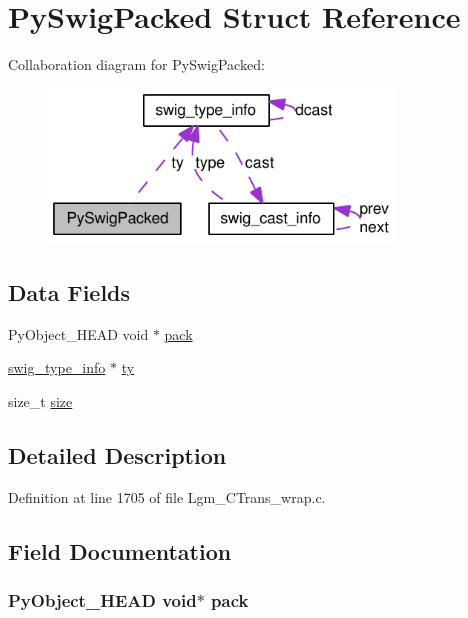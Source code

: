 \hypertarget{struct_py_swig_packed}{
\section{PySwigPacked Struct Reference}
\label{struct_py_swig_packed}
}
Collaboration diagram for PySwigPacked:\nopagebreak
\begin{figure}[H]
\begin{center}
\leavevmode
\includegraphics[width=261pt]{struct_py_swig_packed__coll__graph}
\end{center}
\end{figure}
\subsection*{Data Fields}
\begin{CompactItemize}
\item 
PyObject\_\-HEAD void $\ast$ \hyperlink{struct_py_swig_packed_c20a1b03d60c73f985a7f11d841cbf23}{pack}
\item 
\hyperlink{structswig__type__info}{swig\_\-type\_\-info} $\ast$ \hyperlink{struct_py_swig_packed_6b6270e5da3083fb1e9476b22a0611ad}{ty}
\item 
size\_\-t \hyperlink{struct_py_swig_packed_854352f53b148adc24983a58a1866d66}{size}
\end{CompactItemize}


\subsection{Detailed Description}


Definition at line 1705 of file Lgm\_\-CTrans\_\-wrap.c.

\subsection{Field Documentation}
\hypertarget{struct_py_swig_packed_c20a1b03d60c73f985a7f11d841cbf23}{
\subsubsection[{pack}]{\setlength{\rightskip}{0pt plus 5cm}PyObject\_\-HEAD void$\ast$ {\bf pack}}}
\label{struct_py_swig_packed_c20a1b03d60c73f985a7f11d841cbf23}




